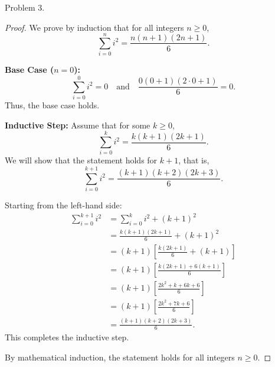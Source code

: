 \documentclass{article}
\begin{document}
Problem 3.
\begin{proof}
We prove by induction that for all integers $n \geq 0$,
\[
\sum_{i=0}^{n} i^2 = \frac{n(n+1)(2n+1)}{6}.
\]

\noindent\textbf{Base Case ($n = 0$):}
\[
\sum_{i=0}^{0} i^2 = 0 \quad \text{and} \quad \frac{0(0+1)(2\cdot0+1)}{6} = 0.
\]
Thus, the base case holds.

\noindent\textbf{Inductive Step:} Assume that for some $k \geq 0$,
\[
\sum_{i=0}^{k} i^2 = \frac{k(k+1)(2k+1)}{6}.
\]
We will show that the statement holds for $k+1$, that is,
\[
\sum_{i=0}^{k+1} i^2 = \frac{(k+1)(k+2)(2k+3)}{6}.
\]

Starting from the left-hand side:
\begin{align*}
\sum_{i=0}^{k+1} i^2 &= \sum_{i=0}^{k} i^2 + (k+1)^2 \\
&= \frac{k(k+1)(2k+1)}{6} + (k+1)^2 \\
&= (k+1)\left[\frac{k(2k+1)}{6} + (k+1)\right] \\
&= (k+1)\left[\frac{k(2k+1) + 6(k+1)}{6}\right] \\
&= (k+1)\left[\frac{2k^2 + k + 6k + 6}{6}\right] \\
&= (k+1)\left[\frac{2k^2 + 7k + 6}{6}\right] \\
&= \frac{(k+1)(k+2)(2k+3)}{6}.
\end{align*}
This completes the inductive step.

\noindent By mathematical induction, the statement holds for all integers $n \geq 0$.
\end{proof}
\end{document}

